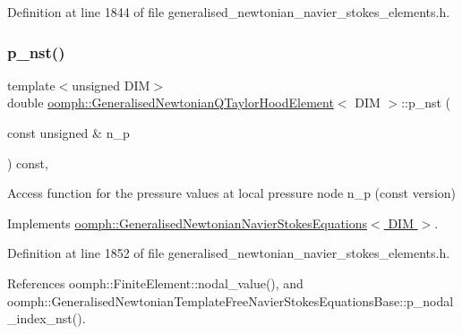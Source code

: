 Definition at line 1844 of file generalised\+\_\+newtonian\+\_\+navier\+\_\+stokes\+\_\+elements.\+h.

\mbox{\label{classoomph_1_1GeneralisedNewtonianQTaylorHoodElement_ab63500fdebdaa2123b503af982467d8a}} 
\subsubsection{\texorpdfstring{p\+\_\+nst()}{p\_nst()}\hspace{0.1cm}{\footnotesize\ttfamily [1/2]}}
{\footnotesize\ttfamily template$<$unsigned D\+IM$>$ \\
double \hyperlink{classoomph_1_1GeneralisedNewtonianQTaylorHoodElement}{oomph\+::\+Generalised\+Newtonian\+Q\+Taylor\+Hood\+Element}$<$ D\+IM $>$\+::p\+\_\+nst (\begin{DoxyParamCaption}\item[{const unsigned \&}]{n\+\_\+p }\end{DoxyParamCaption}) const\hspace{0.3cm}{\ttfamily [inline]}, {\ttfamily [virtual]}}



Access function for the pressure values at local pressure node n\+\_\+p (const version) 



Implements \hyperlink{classoomph_1_1GeneralisedNewtonianNavierStokesEquations_ae56b835810547b77405585b3a4091eec}{oomph\+::\+Generalised\+Newtonian\+Navier\+Stokes\+Equations$<$ D\+I\+M $>$}.



Definition at line 1852 of file generalised\+\_\+newtonian\+\_\+navier\+\_\+stokes\+\_\+elements.\+h.



References oomph\+::\+Finite\+Element\+::nodal\+\_\+value(), and oomph\+::\+Generalised\+Newtonian\+Template\+Free\+Navier\+Stokes\+Equations\+Base\+::p\+\_\+nodal\+\_\+index\+\_\+nst().

\mbox{\label{classoomph_1_1GeneralisedNewtonianQTaylorHoodElement_a88023b1b2683128df3e56181b80105ea}} 
